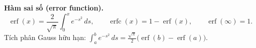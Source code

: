 \textbf{Hàm sai số (error function).}
$$\operatorname{erf}(x)=\frac{2}{\sqrt{\pi}}\int_0^{x} e^{-s^2}\,ds,\qquad
\operatorname{erfc}(x)=1-\operatorname{erf}(x),\qquad \operatorname{erf}(\infty)=1.$$
Tích phân Gauss hữu hạn: $\displaystyle\int_a^b e^{-s^2}\,ds=\tfrac{\sqrt{\pi}}{2}\big(\operatorname{erf}(b)-\operatorname{erf}(a)\big).$
